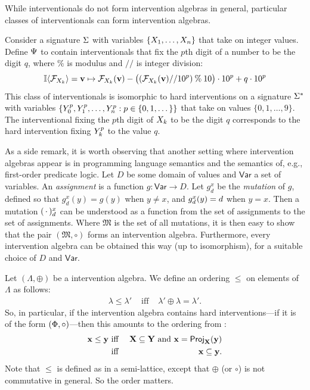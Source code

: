 \documentclass[twoside,11pt]{article}
\begin{document}
While interventionals do not form intervention algebras in general, particular classes of interventionals can form intervention algebras.
\begin{example}
Consider a signature $\Sigma$ with variables $\{X_1, \dots, X_n\}$ that take on integer values. Define $\Psi$ to contain interventionals that fix the $p$th digit of a number to be the digit $q$, where $\%$ is modulus and $//$ is integer division:
\[ \mathbb{I} \langle \mathcal{F}_{X_k} \rangle  = \mathbf{v} \mapsto \mathcal{F}_{X_k}(\mathbf{v}) - \big((\mathcal{F}_{X_k}(\mathbf{v}) // 10^{p}) \mathbin{\%} 10\big) \cdot 10^p  + q \cdot 10^{p}\]
This class of interventionals is isomorphic to hard interventions on a signature $\Sigma^*$ with variables $\{Y^{p}_0, Y^{p}_1, \dots, Y^{p}_n: p \in \{0,1,\dots\}\}$ that take on values $\{0, 1, \dots, 9\}$. The interventional fixing the $p$th digit of $X_k$ to be the digit $q$ corresponds to the hard intervention fixing $Y^{p}_k$ to the value $q$.
\end{example}

\begin{remark} As a side remark, it is worth observing that another setting where intervention algebras appear is in programming language semantics and the semantics of, e.g., first-order predicate logic. Let $D$ be some domain of values and $\mathsf{Var}$ a set of variables. An \emph{assignment} is a function $g:\mathsf{Var}\rightarrow D$. Let $g^{x}_d$ be the \emph{mutation} of $g$, defined so that $g^{x}_d(y) = g(y)$ when $y \neq x$, and $g^x_d(y) = d$ when $y=x$. Then a mutation $(\,\cdot\,)^x_d$ can be understood as a function from the set of assignments to the set of assignments. Where $\mathfrak{M}$ is the set of all mutations, it is then easy to show that the pair $(\mathfrak{M},\circ)$ forms an intervention algebra. Furthermore, every intervention algebra can be obtained this way (up to isomorphism), for a suitable choice of $D$ and $\mathsf{Var}$. \end{remark}



\begin{definition}
Let $(\Lambda,\oplus)$ be a intervention algebra. We define an ordering $\leq$ on elements of $\Lambda$ as follows: \begin{eqnarray*} \lambda \leq \lambda' & \mbox{ iff } & \lambda' \oplus \lambda = \lambda'.
\end{eqnarray*}
So, in particular, if the intervention algebra contains hard interventions---if it is of the form $(\Phi,\circ)$---then this amounts to the ordering from \cite{Rubinstein2017}:
\begin{eqnarray*} \mathbf{x} \leq \mathbf{y} & \mbox{ iff } & \mathbf{X} \subseteq \mathbf{Y} \mbox{ and }\mathbf{x} = \mathsf{Proj}_{\mathbf{X}}(\mathbf{y}) \\
& \mbox{ iff } & \mathbf{x} \subseteq \mathbf{y}.
\end{eqnarray*} Note that $\leq$ is defined as in a semi-lattice, except that $\oplus$ (or $\circ$) is not commutative in general. So the order matters.
    
\end{definition}
\end{document}
